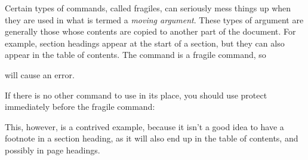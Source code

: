 Certain types of \glspl{command}, called \glspl*{fragile}, can
seriously mess things up when they are used in what is termed a
\emph{moving argument}. These types of
\gls{argument}
are generally those whose contents are copied to another part of the
document. For example, section headings appear at the start of a
section, but they can also appear in the table of contents. The
 command is a fragile command, so
\begin{alltt}\wrong
{}
\end{alltt}
will cause an error.

If there is no other command to use in its place, you should
use \gls{protect} immediately before the
fragile command:
\begin{codeS}
\begin{alltt}
\end{alltt}
\end{codeS}%
This, however, is
a contrived example, because it isn't a good idea to have a footnote
in a
section heading, as it will also end up in the table of contents,
and possibly in page headings.
